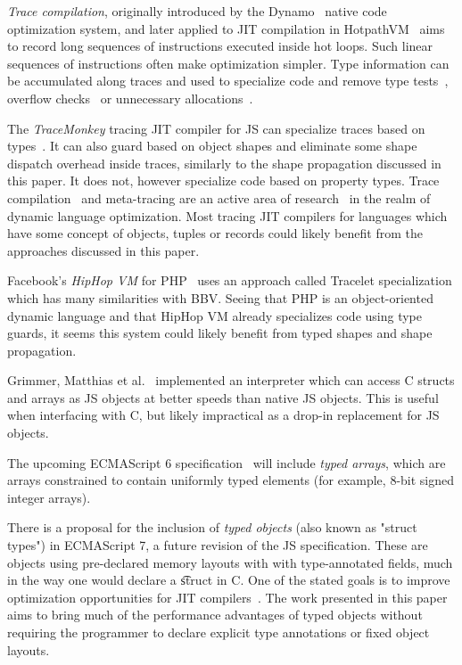 \documentclass[preprint]{sigplanconf}
\begin{document}
{\em Trace compilation}, originally introduced by the Dynamo~\cite{dynamo}
native code optimization system, and later applied to
JIT compilation in HotpathVM~\cite{hotpathvm} aims to record long sequences
of instructions executed inside hot loops. Such linear sequences of
instructions often make optimization simpler. Type information can be
accumulated along traces and used to specialize code and remove type
tests~\cite{trace_type_spec}, overflow checks~\cite{trace_ovf} or unnecessary
allocations~\cite{trace_alloc}.

The {\em TraceMonkey} tracing JIT compiler for JS can specialize traces
based on types~\cite{trace_type_spec}. It can also guard based on object
shapes and eliminate some shape dispatch overhead inside traces, similarly
to the shape propagation discussed in this paper. It does not, however
specialize code based on property types. Trace compilation~\cite{pypy} and
meta-tracing are an active area of research~\cite{bolz_tracing_racket} in the
realm of dynamic language optimization. Most tracing JIT compilers for
languages which have some concept of objects, tuples or records could likely
benefit from the approaches discussed in this paper.

Facebook's {\em HipHop VM} for PHP~\cite{hiphopvm} uses an approach called Tracelet
specialization which has many similarities with BBV. Seeing
that PHP is an object-oriented dynamic language and that HipHop VM already
specializes code using type guards, it seems this system could likely benefit
from typed shapes and shape propagation.



Grimmer, Matthias et al.~\cite{c_structs_js} implemented an interpreter which
can access C structs and arrays as JS objects at better speeds than native
JS objects. This is useful when interfacing with C, but likely impractical as
a drop-in replacement for JS objects.

The upcoming ECMAScript 6 specification~\cite{es6_spec} will include {\em typed
arrays}, which are arrays constrained to contain uniformly typed elements
(for example, 8-bit signed integer arrays).

There is a proposal for the inclusion of {\em typed objects} (also known as
"struct types") in ECMAScript 7, a future revision of the JS
specification. These are objects using pre-declared memory layouts with with
type-annotated fields, much in the way one would declare a {\t struct} in C.
One of the stated goals is to improve optimization opportunities for JIT
compilers~\cite{typed_objects}. The work presented in this paper aims to bring
much of the performance advantages of typed objects without requiring the
programmer to declare explicit type annotations or fixed object layouts.
\end{document}

